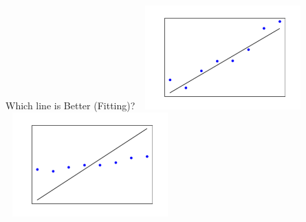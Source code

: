\documentclass[aspectratio=169,14pt]{beamer}
\begin{document}
\begin{frame}{Which line is Better (Fitting)?}
\includegraphics[width=6.5cm,height=4cm]{Images/Lin_reg_Pic4.png}
\hspace{3ex}
\includegraphics[width=6.5cm,height=4cm]{Images/Lin_reg_Pic5.png}
\end{frame}
\end{document}

